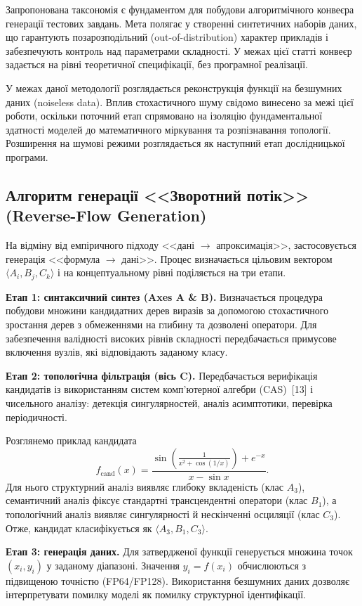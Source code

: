 \documentclass[11pt]{article}
\begin{document}
Запропонована таксономія є фундаментом для побудови алгоритмічного конвеєра генерації тестових завдань. Мета полягає у створенні синтетичних наборів даних, що гарантують позарозподільний (out-of-distribution) характер прикладів і забезпечують контроль над параметрами складності. У межах цієї статті конвеєр задається на рівні теоретичної специфікації, без програмної реалізації.

У межах даної методології розглядається реконструкція функції на безшумних даних (noiseless data). Вплив стохастичного шуму свідомо винесено за межі цієї роботи, оскільки поточний етап спрямовано на ізоляцію фундаментальної здатності моделей до математичного міркування та розпізнавання топології. Розширення на шумові режими розглядається як наступний етап дослідницької програми.

\subsection{Алгоритм генерації <<Зворотний потік>> (Reverse-Flow Generation)}

На відміну від емпіричного підходу <<дані $\rightarrow$ апроксимація>>, застосовується генерація <<формула $\rightarrow$ дані>>. Процес визначається цільовим вектором $\langle A_i,B_j,C_k\rangle$ і на концептуальному рівні поділяється на три етапи.

\textbf{Етап 1: синтаксичний синтез (Axes A \& B).}
Визначається процедура побудови множини кандидатних дерев виразів за допомогою стохастичного зростання дерев з обмеженнями на глибину та дозволені оператори. Для забезпечення валідності високих рівнів складності передбачається примусове включення вузлів, які відповідають заданому класу.

\textbf{Етап 2: топологічна фільтрація (вісь C).}
Передбачається верифікація кандидатів із використанням систем комп'ютерної алгебри (CAS)~[13] і чисельного аналізу: детекція сингулярностей, аналіз асимптотики, перевірка періодичності.

Розглянемо приклад кандидата
\[
f_{\mathrm{cand}}(x)=\frac{\sin\!\left(\frac{1}{x^2+\cos(1/x)}\right)+e^{-x}}{x-\sin x}.
\]
Для нього структурний аналіз виявляє глибоку вкладеність (клас $A_3$), семантичний аналіз фіксує стандартні трансцендентні оператори (клас $B_1$), а топологічний аналіз виявляє сингулярності й нескінченні осциляції (клас $C_3$). Отже, кандидат класифікується як $\langle A_3,B_1,C_3\rangle$.

\textbf{Етап 3: генерація даних.}
Для затвердженої функції генерується множина точок $(x_i,y_i)$ у заданому діапазоні. Значення $y_i=f(x_i)$ обчислюються з підвищеною точністю (FP64/FP128). Використання безшумних даних дозволяє інтерпретувати помилку моделі як помилку структурної ідентифікації.
\end{document}
